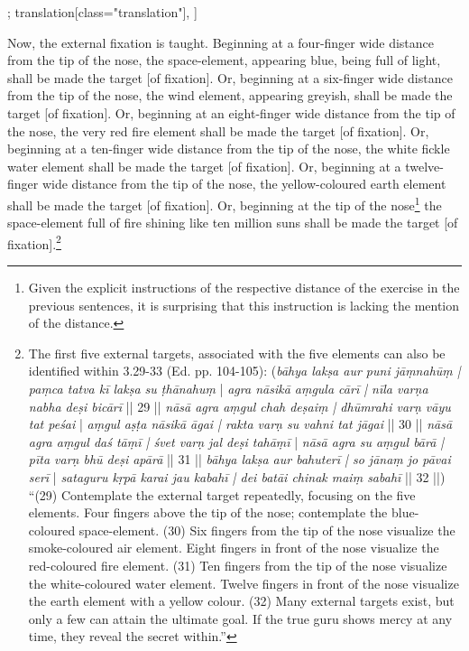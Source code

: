\begin{alignment}[
  texts=edition[class="edition"];
  translation[class="translation"],
  ]
\begin{translation}
\begin{tlate}[p23_01]
  Now, the external fixation is taught. Beginning at a four-finger wide distance from the tip of the nose, the space-element, appearing blue, being full of light, shall be made the target [of fixation]. Or, beginning at a six-finger wide distance from the tip of the nose, the wind element, appearing greyish, shall be made the target [of fixation]. Or, beginning at an eight-finger wide distance from the tip of the nose, the very red fire element shall be made the target [of fixation]. Or, beginning at a ten-finger wide distance from the tip of the nose, the white fickle water element shall be made the target [of fixation]. Or, beginning at a twelve-finger wide distance from the tip of the nose, the yellow-coloured earth element shall be made the target [of fixation]. Or, beginning at the tip of the nose\footnote{Given the explicit instructions of the respective distance of the exercise in the previous sentences, it is surprising that this instruction is lacking the mention of the distance.} the space-element full of fire shining like ten million suns shall be made the target [of fixation].\footnote{The first five external targets, associated with the five elements can also be identified within  3.29-33 (Ed. pp. 104-105): (\textit{bāhya lakṣa aur puni jāṃnahūṃ | paṃca tatva kī lakṣa su ṭhānahuṃ} | \textit{agra nāsikā aṃgula cārī | nīla varṇa nabha deṣi bicārī} || 29 || \textit{nāsā agra aṃgul chah deṣaiṃ | dhūmrahi varṇ vāyu tat peśai} | \textit{aṃgul aṣṭa nāsikā āgai | rakta varṇ su vahni tat jāgai} || 30 || \textit{nāsā agra aṃgul daś tāṃī | śvet varṇ jal deṣi tahāṃī} | \textit{nāsā agra su aṃgul bārā | pīta varṇ bhū deṣi apārā} || 31 || \textit{bāhya lakṣa aur bahuterī | so jānaṃ jo pāvai serī} | \textit{sataguru kṛpā karai jau kabahī | dei batāi chinak maiṃ sabahī} || 32 ||) ``(29) Contemplate the external target repeatedly, focusing on the five elements. Four fingers above the tip of the nose; contemplate the blue-coloured space-element. (30) Six fingers from the tip of the nose visualize the smoke-coloured air element. Eight fingers in front of the nose visualize the red-coloured fire element. (31)  Ten fingers from the tip of the nose visualize the white-coloured water element. Twelve fingers in front of the nose visualize the earth element with a yellow colour. (32) Many external targets exist, but only a few can attain the ultimate goal. If the true guru shows mercy at any time, they reveal the secret within.''}
  \flushpage 
    \end{tlate}
  \end{translation}
\end{alignment}
